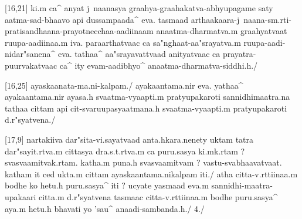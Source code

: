 [16,21]	ki.m ca^ anyat j~naanasya graahya-graahakatva-abhyupagame saty 
aatma-sad-bhaavo api dussampaada^ eva. tasmaad 
arthaakaara-j~naana-sm.rti-pratisandhaana-prayotnecchaa-aadiinaam anaatma-dharmatva.m 
graahyatvaat ruupa-aadiinaa.m iva. paraarthatvaac ca sa"nghaat-aa"srayatva.m 
ruupa-aadi-nidar"sanena^ eva. tathaa^ aa"srayavattvaad anityatvaac ca 
prayatra-puurvakatvaac ca^ ity evam-aadibhyo^ anaatma-dharmatva-siddhi.h./

[16,25]	ayaskaanata-ma.ni-kalpam./ ayakaantama.nir eva. yathaa^ ayakaantama.nir 
ayasa.h svaatma-vyaapti.m pratyupakaroti sannidhimaatra.na tathaa cittam api 
cit-svaruupasyaatmana.h svaatma-vyaapti.m pratyupakaroti d.r"syatvena./

[17,9]	nartakiiva dar"sita-vi.sayatvaad anta.hkara.nenety uktam tatra 
dar"sayit.rtva.m cittasya dra.s.t.rtva.m ca puru.sasya ki.mk.rtam ? 
svasvaamitvak.rtam. katha.m puna.h svasvaamitvam ? vastu-svabhaavatvaat. katham 
it ced ukta.m cittam ayaskaantama.nikalpam iti./ atha citta-v.rttiinaa.m bodhe 
ko hetu.h puru.sasya^ iti ? ucyate yasmaad eva.m sannidhi-maatra-upakaari citta.m 
d.r"syatvena tasmaac citta-v.rttiinaa.m bodhe puru.sasya^ aya.m hetu.h bhavati yo 
'sau^ anaadi-sambanda.h./ 4./
